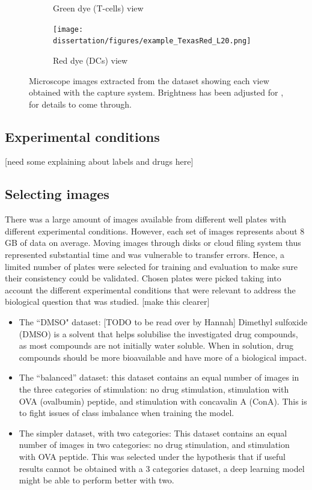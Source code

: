 \begin{figure}[h]
\begin{subfigure}[h!]{0.3\textwidth}
        \caption{Green dye (T-cells) view}
        \label{fig:fov_fitc}
    \end{subfigure}
    \begin{subfigure}[h!]{0.3\textwidth}
        \texttt{[image: dissertation/figures/example\_TexasRed\_L20.png]}
        \caption{Red dye (DCs) view}
        \label{fig:fov_tr}
    \end{subfigure}
    \caption{Microscope images extracted from the dataset showing each view obtained with the capture system. Brightness has been adjusted for ,  for details to come through.}
    \label{fig:fov}
\end{figure}

\subsection{Experimental conditions}

[need some explaining about labels and drugs here]

\subsection{Selecting images}

There was a large amount of images available from different well plates with different experimental conditions. However, each set of images represents about 8 GB of data on average. Moving images through disks or cloud filing system thus represented substantial time and was vulnerable to transfer errors. Hence, a limited number of plates were selected for training and evaluation to make sure their consistency could be validated. Chosen plates were picked taking into account the different experimental conditions that were relevant to address the biological question that was studied. [make this clearer]

\begin{itemize}
    \item The ``DMSO" dataset: [TODO to be read over by Hannah] Dimethyl sulfoxide (DMSO) is a solvent that helps solubilise the investigated drug compounds, as most compounds are not initially water soluble. When in solution, drug compounds should be more bioavailable and have more of a biological impact.
    \item The ``balanced” dataset: this dataset contains an equal number of images in the three categories of stimulation: no drug stimulation, stimulation with OVA (ovalbumin) peptide, and stimulation with concavalin A (ConA). This is to fight issues of class imbalance when training the model.
    \item The simpler dataset, with two categories: This dataset contains an equal number of images in two categories: no drug stimulation, and stimulation with OVA peptide. This was selected under the hypothesis that if useful results cannot be obtained with a 3 categories dataset, a deep learning model might be able to perform better with two.
\end{itemize}

